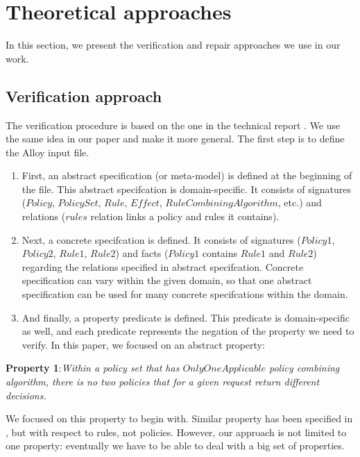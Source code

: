 \documentclass[letterpaper]{acm_proc_article-sp}
\begin{document}
\section{Theoretical approaches}

In this section, we present the verification and repair approaches we use in our work.

\subsection{Verification approach}
\label{sec:verification}

The verification procedure is based on the one in the technical report \cite{acp:alloy}. We use the same idea in our paper and make it more general.
The first step is to define the Alloy input file.

\begin{enumerate}
\item First, an abstract specification  (or meta-model) is defined at the beginning of the file. This abstract specifcation is domain-specific. It consists of signatures ($Policy$, $PolicySet$, $Rule$, $Effect$, $RuleCombiningAlgorithm$, etc.) and relations ($rules$ relation links a policy and rules it contains).

\item Next, a concrete specifcation is defined. It consists of signatures ($Policy1$, $Policy2$, $Rule1$, $Rule2$) and facts ($Policy1$ contains $Rule1$ and $Rule2$) regarding the relations specified in abstract specifcation. Concrete specification can vary within the given domain, so that one abstract specification can be used for many concrete specifcations within the domain.

\item And finally, a property predicate is defined. This predicate is domain-specific as well, and each predicate represents the negation of the property we need to verify. In this paper, we focused on an abstract property: 
\end{enumerate}

\textbf{Property 1}:\textit{Within a policy set that has $OnlyOneApplicable$ policy combining algorithm, there is no two policies that for a given request return different decisions.}

We focused on this property to begin with. Similar property has been specified in \cite{acp:alloy}, but with respect to rules, not policies. However, our approach is not limited to one property: eventually we have to be able to deal with a big set of properties. 
\end{document}
